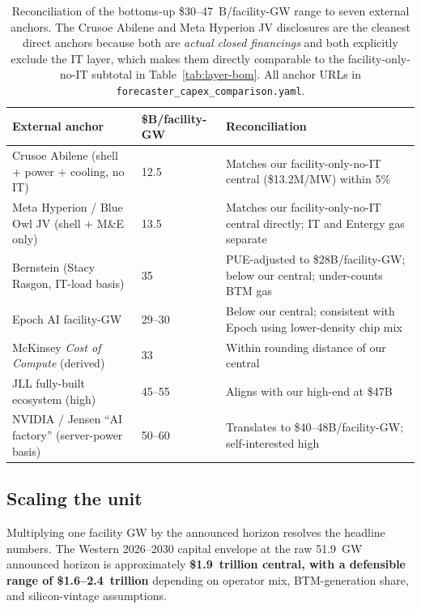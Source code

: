 \begin{table}[h]
\centering
\small
\begin{tabular}{@{}L{5.4cm}R{2.4cm}L{6.0cm}@{}}
\toprule
\textbf{External anchor} & \textbf{\$B/facility-GW} & \textbf{Reconciliation} \\
\midrule
Crusoe Abilene (shell + power + cooling, no IT) & 12.5 & Matches our facility-only-no-IT central (\$13.2M/MW) within 5\% \\
Meta Hyperion / Blue Owl JV (shell + M\&E only) & 13.5 & Matches our facility-only-no-IT central directly; IT and Entergy gas separate \\
Bernstein (Stacy Rasgon, IT-load basis) & 35 & PUE-adjusted to \$28B/facility-GW; below our central; under-counts BTM gas \\
Epoch AI facility-GW & 29--30 & Below our central; consistent with Epoch using lower-density chip mix \\
McKinsey \emph{Cost of Compute} (derived) & 33 & Within rounding distance of our central \\
JLL fully-built ecosystem (high) & 45--55 & Aligns with our high-end at \$47B \\
NVIDIA / Jensen ``AI factory'' (server-power basis) & 50--60 & Translates to \$40--48B/facility-GW; self-interested high \\
\bottomrule
\end{tabular}
\caption{Reconciliation of the bottoms-up \$30--47~B/facility-GW range to seven external anchors. The Crusoe Abilene and Meta Hyperion JV disclosures are the cleanest direct anchors because both are \emph{actual closed financings} and both explicitly exclude the IT layer, which makes them directly comparable to the facility-only-no-IT subtotal in Table~\ref{tab:layer-bom}. All anchor URLs in \texttt{forecaster\_capex\_comparison.yaml}.}
\label{tab:capex-reconciliation}
\end{table}

\subsection{Scaling the unit}
\label{subsec:scaling-the-unit}

Multiplying one facility GW by the announced horizon resolves the headline numbers. The Western 2026--2030 capital envelope at the raw 51.9~GW announced horizon is approximately \textbf{\$1.9~trillion central, with a defensible range of \$1.6--2.4~trillion} depending on operator mix, BTM-generation share, and silicon-vintage assumptions.

